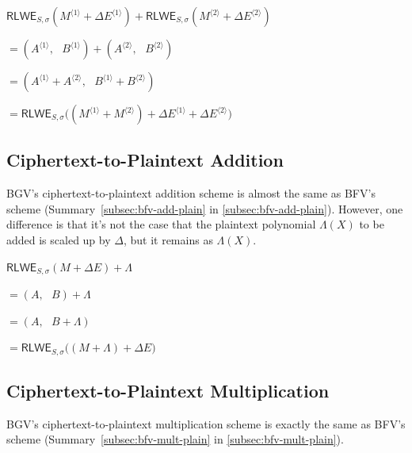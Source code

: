 \begin{tcolorbox}[title={\textbf{\tboxlabel{\ref*{subsec:bgv-add-cipher}} BGV Ciphertext-to-Ciphertext Addition}}]
$\textsf{RLWE}_{S, \sigma}(M^{\langle 1 \rangle} + \Delta E^{\langle 1 \rangle} ) + \textsf{RLWE}_{S, \sigma}(M^{\langle 2 \rangle} + \Delta E^{\langle 2 \rangle}) $

$ = ( A^{\langle 1 \rangle}, \text{ } B^{\langle 1 \rangle}) + (A^{\langle 2 \rangle}, \text{ } B^{\langle 2 \rangle}) $

$ = ( A^{\langle 1 \rangle} + A^{\langle 2 \rangle}, \text{ } B^{\langle 1 \rangle} + B^{\langle 2 \rangle} ) $

$= \textsf{RLWE}_{S, \sigma}\bm((M^{\langle 1 \rangle} + M^{\langle 2 \rangle})  + \Delta E^{\langle 1 \rangle} + \Delta E^{\langle 2 \rangle} \bm)$
\end{tcolorbox}

\subsection{Ciphertext-to-Plaintext Addition}
\label{subsec:bgv-add-plain}

BGV's ciphertext-to-plaintext addition scheme is almost the same as BFV's scheme (Summary~\ref*{subsec:bfv-add-plain} in \autoref{subsec:bfv-add-plain}). However, one difference is that it's not the case that the plaintext polynomial $\Lambda(X)$ to be added is scaled up by $\Delta$, but it remains as $\Lambda(X)$.

\begin{tcolorbox}[title={\textbf{\tboxlabel{\ref*{subsec:bgv-add-plain}} BGV Ciphertext-to-Plaintext Addition}}]
$\textsf{RLWE}_{S, \sigma}(M + \Delta E) + \Lambda $

$=  (A, \text{ } B) + \Lambda$

$=  (A, \text{ } B + \Lambda)$

$= \textsf{RLWE}_{S, \sigma}\bm((M + \Lambda) + \Delta E \bm)$
\end{tcolorbox}


\subsection{Ciphertext-to-Plaintext Multiplication}
\label{subsec:bgv-mult-plain}




BGV's ciphertext-to-plaintext multiplication scheme is exactly the same as BFV's scheme (Summary~\ref*{subsec:bfv-mult-plain} in \autoref{subsec:bfv-mult-plain}). 


